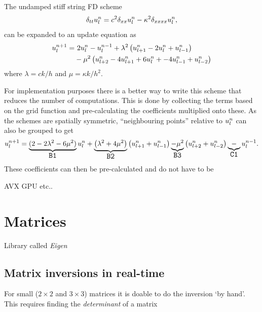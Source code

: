The undamped stiff string FD scheme%
\begin{equation}
    \delta_{tt} u_l^n = c^2 \delta_{xx} u_l^n - \kappa^2 \delta_{xxxx} u_l^n,
\end{equation}
can be expanded to an update equation as
\begin{equation}
    \begin{aligned}
        u_l^{n+1} = &\ 2u_l^n - u_l^{n-1} + \lambda^2 \left(u_{l+1}^n - 2u_l^n + u_{l-1}^n\right)\\
        & - \mu^2 \left(u_{l+2}^n - 4u_{l+1}^n + 6u_l^n + -4u_{l-1}^n + u_{l-2}^n\right)
    \end{aligned}
\end{equation}
where $\lambda = ck/h$ and $\mu = \kappa k / h^2$.

For implementation purposes there is a better way to write this scheme that reduces the number of computations. This is done by collecting the terms based on the grid function and pre-calculating the coefficients multiplied onto these. As the schemes are spatially symmetric, ``neighbouring points'' relative to $u_l^n$ can also be grouped to get
\def\semilarge{\fontsize{11}{11.6}\selectfont}
\begin{equation}
    u_l^{n+1} = \underbrace{(2 - 2\lambda^2 - 6\mu^2)}_{\texttt{\semilarge B1}}\uln  + \underbrace{\left(\lambda^2 + 4\mu^2\right)}_{\texttt{\semilarge B2}}\left(u_{l+1}^n+u_{l-1}^n\right)\underbrace{-\mu^2}_{\texttt{\semilarge B3}} \left(u_{l+2}^n+u_{l-2}^n\right) \underbrace{-}_{\texttt{\semilarge C1}} u_l^{n-1}.
\end{equation}
These coefficients can then be pre-calculated and do not have to be 



\cite{Webb2015}
AVX GPU etc..\cite{Bilbao2019CMJb}



\section{Matrices}\label{sec:realTimeMatrices}

Library called \textit{Eigen} \cite{Eigen}

\subsection{Matrix inversions in real-time}\label{sec:RTmatrixInversion}
For small ($2\times 2$ and $3\times 3$) matrices it is doable to do the inversion `by hand'. This requires finding the \textit{determinant} of a matrix

